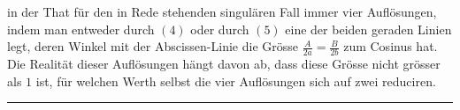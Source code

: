 %
in der That für den in Rede stehenden singulären Fall immer vier Auflösungen, indem man entweder durch \((4)\) oder durch \((5)\) eine der beiden geraden Linien legt, deren Winkel mit der Abscissen-Linie die Grösse \(\frac A{2a}=\frac B{2b}\) zum Cosinus hat. Die Realität dieser Auflösungen hängt davon ab, dass diese Grösse nicht grösser als \(1\) ist, für welchen Werth selbst die vier Auflösungen sich auf zwei reduciren.
\par\bigskip\begin{center}\rule{.16\textwidth}{.3pt}\end{center}
